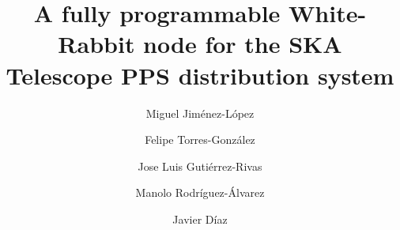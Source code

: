 \documentclass[review]{elsarticle}
\begin{document}
\begin{frontmatter}

\title{A fully programmable White-Rabbit node for the SKA Telescope PPS distribution system}


\author{Miguel Jiménez-López}
\author{Felipe Torres-González}
\author{Jose Luis Gutiérrez-Rivas}
\author{Manolo Rodríguez-Álvarez}
\author{Javier Díaz}
\address{CITIC, ETSIIT, University of Granada, Spain}






\end{frontmatter}
\end{document}
